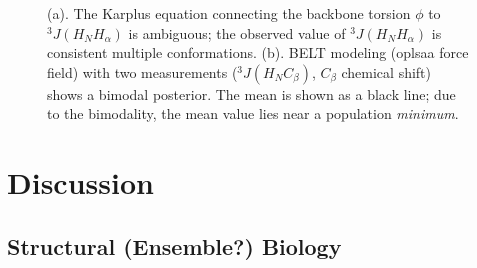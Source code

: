 \documentclass[11pt,titlepage]{article}
\begin{document}
\begin{figure}
\caption{
(a).  The Karplus equation connecting the backbone torsion $\phi$ to $^3J(H_NH_\alpha)$ is ambiguous; the observed value of $^3J(H_NH_\alpha)$ is consistent multiple conformations.  (b).  BELT modeling (oplsaa force field) with two measurements ($^3J(H_N C_\beta)$, $C_\beta$ chemical shift) shows a bimodal posterior.  The mean is shown as a black line; due to the bimodality, the mean value lies near a population \emph{minimum}.
}
\label{figure:Ambiguity}

\end{figure}



\section*{Discussion}

\subsection*{Structural (Ensemble?) Biology}
\end{document}
